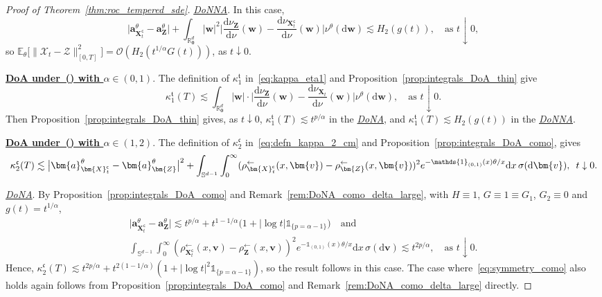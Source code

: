 \documentclass[en,oneside,bbfont,article]{amsart}
\theoremstyle{remark}
\theoremstyle{definition}
\theoremstyle{definition}
\newcommand\X{\bm{\mathcal{X}}}
\newcommand\ZZ{\bm{\mathcal{Z}}}
\newcommand\Sp{\mathbb{S}}
\newcommand\R{\mathbb{R}}
\newcommand\E{\mathds{E}}
\newcommand\1{\mathds{1}}
\newcommand\Oh{\mathcal{O}}
\newcommand\da{\downarrow}
\newcommand\la{\leftarrow}
\newcommand\co{\mathsf{c}}
\newcommand{\D}{\mathrm{d}}
\newcommand{\mft}{{\mathfrak{t}}}
\newcommand{\mfc}{{\mathfrak{c}}}
\begin{document}
\begin{proof}[Proof of Theorem~\ref{thm:roc_tempered_sde}]
{\underline{\textit{DoNNA}}}. In this case, 
\[
\big|\bm{a}_{\bm{X}^\co_t}^\theta-\bm{a}_{\bm{Z}}^\theta\big|
+\int_{\R^d_{\bm 0}} |\bm{w}|^2\bigg|\frac{\D\nu_{\bm{Z}}}{\D\nu}(\bm{w})
-\frac{\D\nu_{\bm{X}_t^\co}}{\D\nu}(\bm{w})\bigg| \nu^\theta(\D\bm{w})
\lesssim H_2(g(t)),
\quad\text{as }t\da 0,
\]
so $\E_\theta\big[\|\X_t-\ZZ\|_{[0,T]}^2\big] =\Oh(H_2(t^{1/\alpha}G(t)))$, as $t \da 0$.

\underline{\textbf{DoA under~() with $\alpha \in (0,1)$}}. The definition of $\kappa_1^\mft$ in~\eqref{eq:kappa_eta1} and Proposition~\ref{prop:integrals_DoA_thin} give
\[
\kappa_1^\mft(T)
\lesssim \int_{\R^d_{\bm0}}|\bm{w}|\cdot
\bigg|\frac{\D\nu_{\bm{Z}}}{\D\nu}(\bm{w})
-\frac{\D\nu_{\bm{X}_t}}{\D\nu}(\bm{w})\bigg| \nu^\theta(\D\bm{w}),
\quad\text{as }t\da 0.
\]
Then Proposition~\ref{prop:integrals_DoA_thin} gives, as $t\da 0$, $\kappa_1^\mft(T)\lesssim t^{p/\alpha}$ in the {\underline{\textit{DoNA}}}, and $\kappa_1^\mft(T)\lesssim H_2(g(t))$ in the {\underline{\textit{DoNNA}}}.


\underline{\textbf{DoA under~() with $\alpha\in(1,2)$}}. The definition of $\kappa_2^\mfc$ in~\eqref{eq:defn_kappa_2_cm} and Proposition~\ref{prop:integrals_DoA_como}, gives
\[
\kappa^\mfc_2(T) \lesssim  
\big|\bm{a}_{\bm{X}_t^\co}^\theta-\bm{a}_{\bm{Z}}^\theta\big|^2 
+\int_{\Sp^{d-1}}\int_0^\infty
(\rho_{\bm{X}_t^\co}^{\la}(x,\bm{v})-\rho_{\bm{Z}}^{\la}(x,\bm{v}))^2 e^{-\1_{(0,1)}(x) \theta/x } \D x \, \sigma(\D \bm{v}),
\enskip t\da 0.
\]

{\underline{\textit{DoNA}}}. By Proposition~\ref{prop:integrals_DoA_como} and Remark~\ref{rem:DoNA_como_delta_large}, with $H\equiv 1$, $G\equiv 1\equiv G_1$, $G_2\equiv 0$ and $g(t)=t^{1/\alpha}$, 
\begin{gather*}
\big|\bm{a}_{\bm{X}^\co_t}^\theta-\bm{a}_{\bm{Z}}^\theta\big|
\lesssim t^{p/\alpha}+t^{1-1/\alpha}\big(1 +|\log t|\1_{\{p=\alpha-1\}}\big)
\quad\text{and}\\
\int_{\Sp^{d-1}}\int_0^\infty
(\rho_{\bm{X}_t^\co}^{\la}(x,\bm{v})-\rho_{\bm{Z}}^{\la}(x,\bm{v}))^2 e^{-\1_{(0,1)}(x) \theta/x } \D x \, \sigma(\D \bm{v})
\lesssim t^{2p/\alpha},
\quad\text{as }t\da 0.
\end{gather*} 
Hence, $\kappa_2^\mfc(T) \lesssim t^{2p/\alpha}+%
t^{2(1-1/\alpha)}(1+|\log t|^2\1_{\{p=\alpha-1\}})$, so the result follows in this case. The case where~\eqref{eq:symmetry_como} also holds again follows from Proposition~\ref{prop:integrals_DoA_como} and Remark~\ref{rem:DoNA_como_delta_large} directly.


\end{proof}
\end{document}
